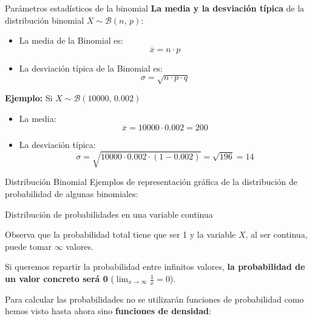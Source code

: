 \documentclass[11pt,handout]{beamer}
\begin{document}
\begin{frame}{Parámetros estadísticos de la binomial}
\textbf{La media y la desviación típica} de la distribución binomial $X \sim \mathcal{B}(n,\,p)$:

\begin{block}{}
\begin{itemize}
    \item La media de la Binomial es:  $$\overline{x}=n\cdot p$$
    \item La desviación típica de la Binomial es:  $$\sigma=\sqrt{n\cdot p\cdot q}$$
\end{itemize}
\end{block}

\textbf{Ejemplo:} Si $X \sim \mathcal{B}(10000,\,0.002)$
\begin{itemize}
    \item La media:  $$\overline{x}=10000\cdot 0.002= 200$$
    \item La desviación típica:  $$\sigma=\sqrt{10000\cdot 0.002\cdot (1-0.002)}=\sqrt{196}=14$$
\end{itemize}

    
\end{frame}


\begin{frame}{Distribución Binomial}
Ejemplos de representación gráfica de la distribución de probabilidad de algunas binomiales:    
         
    
\end{frame}


\begin{frame}{Distribución de probabilidades en una variable continua}

Observa que la probabilidad total tiene que ser 1 y la variable $X$, al ser continua, puede tomar $\infty$ valores.
\begin{block}{}
Si queremos repartir la probabilidad entre infinitos valores, \textbf{la probabilidad de un valor concreto será 0} ($\lim_{x \to \infty}\frac{1}{x}=0$). 
\end{block}
   

Para calcular las probabilidades no se utilizarán funciones de probabilidad como hemos visto hasta ahora sino \textbf{funciones de densidad}:
\end{frame}
\end{document}
